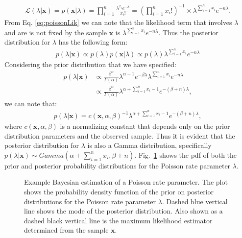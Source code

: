\begin{DoubleSpace*}
\begin{align}
	\mathcal{L}(\lambda|\textbf{x})=p(\textbf{x}|\lambda)=\prod_{i=1}^n \frac{\lambda^{x_i}e^{-\lambda}}{x_i!}= \left( \prod_{i=1}^n x_i! \right)^{-1} \times \lambda^{\sum_{i=1}^n x_i} e^{-n\lambda}. 
	\label{eq:poissonLik}
\end{align}
From Eq. \ref{eq:poissonLik} we can note that the likelihood term that involves $\lambda$ and are is not fixed by the sample $\textbf{x}$ is $\lambda^{\sum_{i=1}^n x_i} e^{-n\lambda}$. Thus the posterior distribution for $\lambda$ has the following form:
\begin{align}
	p(\lambda|\textbf{x})\propto p(\lambda) p(\textbf{x}|\lambda) \propto p(\lambda)\lambda^{\sum_{i=1}^n x_i} e^{-n\lambda}
\end{align}
Considering the prior distribution that we have specified:
\begin{align}
	p(\lambda|\textbf{x})&\propto \frac{\beta^{\alpha}}{\Gamma(\alpha)}\lambda^{\alpha-1}e^{-\beta \lambda} \lambda^{\sum_{i=1}^n x_i} e^{-n\lambda} \\
	&\propto \frac{\beta^{\alpha}}{\Gamma(\alpha)} \lambda^{\alpha + \sum_{i=1}^n x_i -1} e^{-(\beta+n)\lambda},
\end{align}
we can note that:
\begin{align}
p(\lambda|\textbf{x}) =c(\textbf{x},\alpha,\beta)^{-1} \lambda^{\alpha + \sum_{i=1}^n x_i -1} e^{-(\beta+n)\lambda},
\end{align}
where $c(\textbf{x},\alpha,\beta)$ is a normalizing constant that depends only on the prior distribution parameters and the observed sample. Thus it is evident that the posterior distribution for $\lambda$ is also a Gamma distribution, specifically $p(\lambda|\textbf{x})\sim Gamma(\alpha+ \sum_{i=1}^n x_i, \beta+n)$. Fig.~\ref{fig:pois} shows the pdf of both the prior and posterior probability distributions for the Poisson rate parameter $\lambda$.

\begin{figure}[ht]
	\caption[Example Bayesian estimation of a Poisson rate parameter]{\DoubleSpacing Example Bayesian estimation of a Poisson rate parameter. The plot shows the probability density function of the prior on posterior distributions for the Poisson rate parameter $\lambda$. Dashed blue vertical line shows the mode of the posterior distribution. Also shown as a dashed black vertical line is the maximum likelihood estimator determined from the sample $\textbf{x}$. \label{fig:pois} }
\end{figure}


\end{DoubleSpace*}
